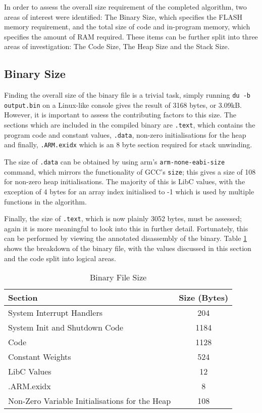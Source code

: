 
In order to assess the overall size requirement of the completed algorithm, two areas of interest were identified: The Binary Size, which specifies the FLASH memory requirement, and the total size of code and in-program memory, which specifies the amount of RAM required. These items can be further split into three areas of investigation: The Code Size, The Heap Size and the Stack Size.

\subsection{Binary Size}

Finding the overall size of the binary file is a trivial task, simply running \verb|du -b output.bin| on a Linux-like console gives the result of 3168 bytes, or 3.09kB. However, it is important to assess the contributing factors to this size. The sections which are included in the compiled binary are \verb|.text|, which contains the program code and constant values, \verb|.data|, non-zero initialisations for the heap and finally, \verb|.ARM.exidx| which is an 8 byte section required for stack unwinding.

The size of \verb|.data| can be obtained by using arm's \verb|arm-none-eabi-size| command, which mirrors the functionality of GCC's \verb|size|; this gives a size of 108 for non-zero heap initialisations. The majority of this is LibC values, with the exception of 4 bytes for an array index initialised to -1 which is used by multiple functions in the algorithm.

Finally, the size of \verb|.text|, which is now plainly 3052 bytes, must be assessed; again it is more meaningful to look into this in further detail. Fortunately, this can be performed by viewing the annotated disassembly of the binary. Table \ref{tab:prog-size} shows the breakdown of the binary file, with the values discussed in this section and the code split into logical areas.

\begin{table}[h]
    \centering
    \begin{tabular}{|l|c|}
        \hline
        Section & Size (Bytes) \\
        \hline
        System Interrupt Handlers & 204 \\
        System Init and Shutdown Code & 1184 \\
        Code & 1128 \\
        Constant Weights & 524 \\
        LibC Values & 12 \\
        .ARM.exidx & 8 \\
        Non-Zero Variable Initialisations for the Heap & 108 \\
        \hline
    \end{tabular}
    \caption{Binary File Size \label{tab:prog-size}}
\end{table}

